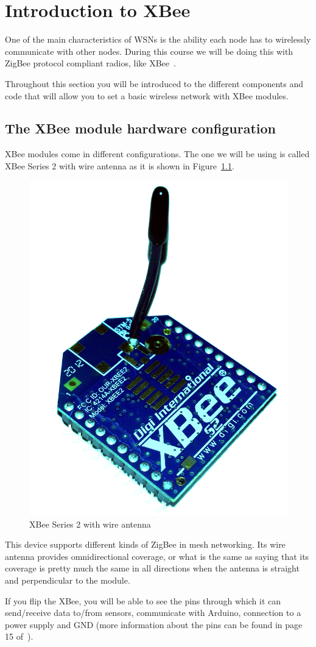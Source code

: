 \chapter{Introduction to XBee}

One of the main characteristics of WSNs is the ability each node has to wirelessly communicate with other nodes. 
During this course we will be doing this with ZigBee protocol compliant radios, like XBee~\cite{faludi2010bws}.

Throughout this section you will be introduced to the different components and code that will allow you to set a basic wireless network with XBee modules.

\section{The XBee module hardware configuration}\label{xbee:hardware}

XBee modules come in different configurations. The one we will be using is called XBee Series 2 with wire antenna as it is shown in Figure~\ref{fig:xbee}.

\begin{figure}[htbp]
  \centering
  \includegraphics[width=0.4\linewidth]{figures/xbee.eps}
  \caption{XBee Series 2 with wire antenna
  \label{fig:xbee}}
\end{figure}

This device supports different kinds of ZigBee in mesh networking. Its wire antenna provides omnidirectional coverage, or what is the same as saying that its coverage is pretty much the same in all directions when the antenna is straight and perpendicular to the module.

If you flip the XBee, you will be able to see the pins through which it can send/receive data to/from sensors, communicate with Arduino, connection to a power supply and GND (more information about the pins can be found in page 15 of~\cite{faludi2010bws}).

